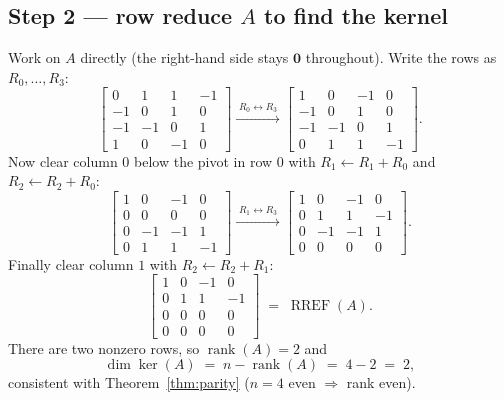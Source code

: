\documentclass[11pt]{article}
\newcommand{\zero}{\mathbf{0}}
\DeclareMathOperator{\rank}{rank}
\theoremstyle{plain}
\theoremstyle{definition}
\begin{document}
\subsection{Step 2 --- row reduce \texorpdfstring{$A$}{A} to find the kernel}

Work on $A$ directly (the right-hand side stays $\zero$ throughout). Write the rows
as $R_0,\dots,R_3$:
\[
  \left[\begin{array}{rrrr}
     0 &  1 &  1 & -1 \\
    -1 &  0 &  1 &  0 \\
    -1 & -1 &  0 &  1 \\
     1 &  0 & -1 &  0
  \end{array}\right]
  \xrightarrow{\;R_0\leftrightarrow R_3\;}
  \left[\begin{array}{rrrr}
     1 &  0 & -1 &  0 \\
    -1 &  0 &  1 &  0 \\
    -1 & -1 &  0 &  1 \\
     0 &  1 &  1 & -1
  \end{array}\right].
\]
Now clear column $0$ below the pivot in row $0$ with
$R_1\!\leftarrow\!R_1+R_0$ and $R_2\!\leftarrow\!R_2+R_0$:
\[
  \left[\begin{array}{rrrr}
     1 &  0 & -1 &  0 \\
     0 &  0 &  0 &  0 \\
     0 & -1 & -1 &  1 \\
     0 &  1 &  1 & -1
  \end{array}\right]
  \xrightarrow{\;R_1\leftrightarrow R_3\;}
  \left[\begin{array}{rrrr}
     1 &  0 & -1 &  0 \\
     0 &  1 &  1 & -1 \\
     0 & -1 & -1 &  1 \\
     0 &  0 &  0 &  0
  \end{array}\right].
\]
Finally clear column $1$ with $R_2\!\leftarrow\!R_2+R_1$:
\[
  \left[\begin{array}{rrrr}
     1 &  0 & -1 &  0 \\
     0 &  1 &  1 & -1 \\
     0 &  0 &  0 &  0 \\
     0 &  0 &  0 &  0
  \end{array}\right]
  \;=\; \operatorname{RREF}(A).
\]
There are two nonzero rows, so $\rank(A)=2$ and
\[
  \dim\ker(A) \;=\; n-\rank(A) \;=\; 4-2 \;=\; 2,
\]
consistent with Theorem~\ref{thm:parity} ($n=4$ even $\Rightarrow$ rank even).
\end{document}
